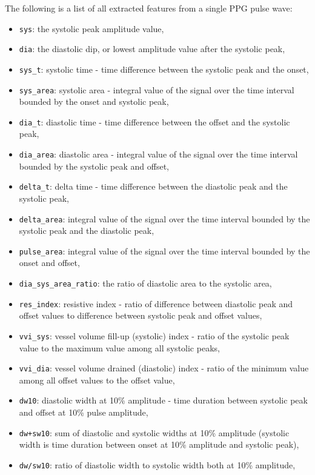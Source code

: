 The following is a list of all extracted features from a single PPG pulse wave:
\begin{itemize}
    \item \texttt{sys}: the systolic peak amplitude value,
    \item \texttt{dia}: the diastolic dip, or lowest amplitude value after the systolic peak,
    \item \texttt{sys\_t}: systolic time - time difference between the systolic peak and the onset,
    \item \texttt{sys\_area}: systolic area - integral value of the signal over the time interval bounded by the onset and systolic peak,
    \item \texttt{dia\_t}: diastolic time - time difference between the offset and the systolic peak,
    \item \texttt{dia\_area}: diastolic area - integral value of the signal over the time interval bounded by the systolic peak and offset,
    \item \texttt{delta\_t}: delta time - time difference between the diastolic peak and the systolic peak,
    \item \texttt{delta\_area}: integral value of the signal over the time interval bounded by the systolic peak and the diastolic peak,
    \item \texttt{pulse\_area}: integral value of the signal over the time interval bounded by the onset and offset,
    \item \texttt{dia\_sys\_area\_ratio}: the ratio of diastolic area to the systolic area,
    \item \texttt{res\_index}: resistive index - ratio of difference between diastolic peak and offset values to difference between systolic peak and offset values,
    \item \texttt{vvi\_sys}: vessel volume fill-up (systolic) index - ratio of the systolic peak value to the maximum value among all systolic peaks,
    \item \texttt{vvi\_dia}: vessel volume drained (diastolic) index - ratio of the minimum value among all offset values to the offset value,
    \item \texttt{dw10}: diastolic width at 10\% amplitude - time duration between systolic peak and offset at 10\% pulse amplitude,
    \item \texttt{dw+sw10}: sum of diastolic and systolic widths at 10\% amplitude (systolic width is time duration between onset at 10\% amplitude and systolic peak),
    \item \texttt{dw/sw10}: ratio of diastolic width to systolic width both at 10\% amplitude,

\end{itemize}
